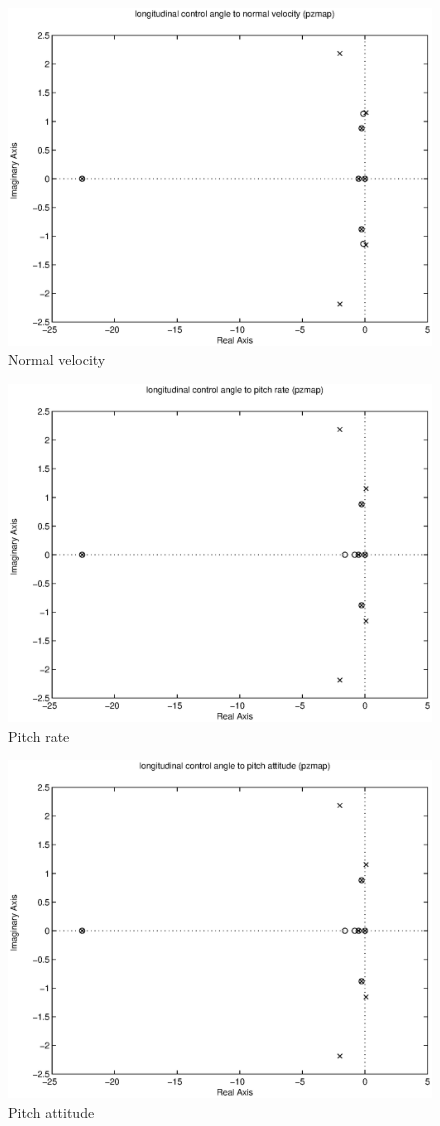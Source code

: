 \documentclass{sydeStyle}
\begin{document}
\begin{figure}[h]
    \centering
    \includegraphics[width=0.8\columnwidth]{figs/12pz}
    \caption{Normal velocity}
\end{figure}

\begin{figure}[h]
    \centering
    \includegraphics[width=0.8\columnwidth]{figs/13pz}
    \caption{Pitch rate}
\end{figure}

\begin{figure}[h]
    \centering
    \includegraphics[width=0.8\columnwidth]{figs/14pz}
    \caption{Pitch attitude}
    \label{fig:long4}
\end{figure}
\end{document}
